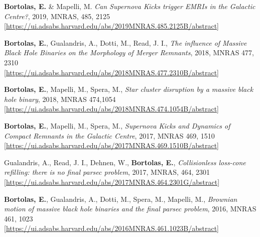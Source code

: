 \documentclass[11pt,a4paper]{article}
\begin{document}
\begin{etaremune}

\item {\bf Bortolas, E.} \& Mapelli, M. { \it Can Supernova Kicks trigger EMRIs in the Galactic Centre?}, 2019, MNRAS, 485, 2125 \\ \href{https://ui.adsabs.harvard.edu/abs/2019MNRAS.485.2125B/abstract}{\scriptsize [https://ui.adsabs.harvard.edu/abs/2019MNRAS.485.2125B/abstract]}

\item {\bf Bortolas, E.}, Gualandris, A., Dotti, M., Read, J. I., { \it The influence of Massive Black Hole Binaries on the Morphology of Merger Remnants},  2018, MNRAS 477, 2310 \\ \href{https://ui.adsabs.harvard.edu/abs/2018MNRAS.477.2310B/abstract}{\scriptsize [https://ui.adsabs.harvard.edu/abs/2018MNRAS.477.2310B/abstract]}

\item {\bf Bortolas, E.}, Mapelli, M., Spera, M., { \it Star cluster disruption by a massive black hole binary}, 2018, MNRAS 474,1054 \\ \href{https://ui.adsabs.harvard.edu/abs/2018MNRAS.474.1054B/abstract}{\scriptsize [https://ui.adsabs.harvard.edu/abs/2018MNRAS.474.1054B/abstract]}

\item {\bf Bortolas, E.}, Mapelli, M., Spera, M., {\it Supernova Kicks and Dynamics of Compact Remnants in the Galactic Centre}, 2017, MNRAS 469, 1510 \\ \href{https://ui.adsabs.harvard.edu/abs/2017MNRAS.469.1510B/abstract}{\scriptsize [https://ui.adsabs.harvard.edu/abs/2017MNRAS.469.1510B/abstract]} 

\item Gualandris, A., Read, J. I., Dehnen, W., {\bf Bortolas, E.}, {\it Collisionless loss-cone refilling: there is no final parsec problem}, 2017, MNRAS, 464, 2301 
\\ \href{https://ui.adsabs.harvard.edu/abs/2017MNRAS.464.2301G/abstract}{\scriptsize [https://ui.adsabs.harvard.edu/abs/2017MNRAS.464.2301G/abstract]}


\item {\bf Bortolas, E.}, Gualandris, A., Dotti, M., Spera, M., Mapelli, M., {\it Brownian motion of massive black hole binaries and the final parsec problem}, 2016, MNRAS 461, 1023 \\ \href{https://ui.adsabs.harvard.edu/abs/2016MNRAS.461.1023B/abstract}{\scriptsize [https://ui.adsabs.harvard.edu/abs/2016MNRAS.461.1023B/abstract]}


\end{etaremune}
\end{document}
